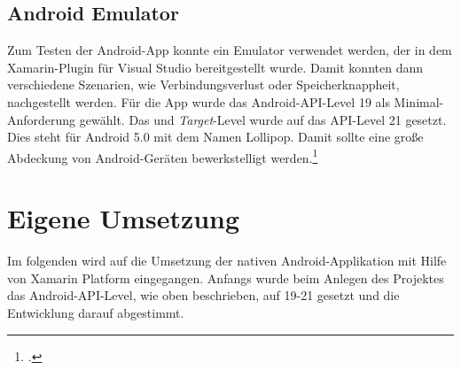 \subsection{Android Emulator}
\label{ssec:xamarin-emulator}
Zum Testen der Android-App konnte ein Emulator verwendet werden, der in dem Xamarin-Plugin für Visual Studio bereitgestellt wurde. Damit konnten dann verschiedene Szenarien, wie Verbindungsverlust oder Speicherknappheit, nachgestellt werden. Für die App wurde das Android-API-Level 19 als Minimal-Anforderung gewählt. Das und \textit{Target}-Level wurde auf das API-Level 21 gesetzt. Dies steht für Android 5.0 mit dem Namen Lollipop. Damit sollte eine große Abdeckung von Android-Geräten bewerkstelligt werden.\footcite{Xamarin-API}
\section{Eigene Umsetzung}
\label{sec:nat-umsetzung}
Im folgenden wird auf die Umsetzung der nativen Android-Applikation mit Hilfe von Xamarin Platform eingegangen. Anfangs wurde beim Anlegen des Projektes das Android-API-Level, wie oben beschrieben, auf 19-21 gesetzt und die Entwicklung darauf abgestimmt.

